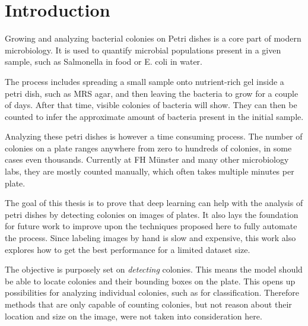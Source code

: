 \chapter{Introduction}
\label{ch:intro}

Growing and analyzing bacterial colonies on Petri dishes is a core part of modern microbiology. It is used to quantify microbial populations present in a given sample, such as Salmonella in food or E. coli in water.

The process includes spreading a small sample onto nutrient-rich gel inside a petri dish, such as MRS agar, and then leaving the bacteria to grow for a couple of days. After that time, visible colonies of bacteria will show. They can then be counted to infer the approximate amount of bacteria present in the initial sample.

Analyzing these petri dishes is however a time consuming process. The number of colonies on a plate ranges anywhere from zero to hundreds of colonies, in some cases even thousands. Currently at FH Münster and many other microbiology labs, they are mostly counted manually, which often takes multiple minutes per plate.

The goal of this thesis is to prove that deep learning can help with the analysis of petri dishes by detecting colonies on images of plates. It also lays the foundation for future work to improve upon the techniques proposed here to fully automate the process. Since labeling images by hand is slow and expensive, this work also explores how to get the best performance for a limited dataset size.

The objective is purposely set on \textit{detecting} colonies. This means the model should be able to locate colonies and their bounding boxes on the plate. This opens up possibilities for analyzing individual colonies, such as for classification. Therefore methods that are only capable of counting colonies, but not reason about their location and size on the image, were not taken into consideration here.
